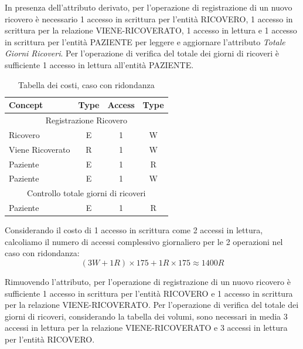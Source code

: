 \documentclass{article}
\begin{document}
In presenza dell'attributo derivato, per l'operazione di registrazione di un nuovo ricovero è necessario 1 accesso in scrittura per l'entità RICOVERO, 1 accesso in scrittura per la relazione VIENE-RICOVERATO, 1 accesso in lettura e 1 accesso in scrittura per l'entità PAZIENTE per leggere e aggiornare l'attributo \textit{Totale Giorni Ricoveri}.
Per l'operazione di verifica del totale dei giorni di ricoveri è sufficiente 1 accesso in lettura all'entità PAZIENTE.

\begin{table}[H]
	\centering
	\begin{tabular}{|l|c|c|c|}
		\hline
		\textbf{Concept} & \textbf{Type} & \textbf{Access} & \textbf{Type} \\ \hline
		\multicolumn{4}{|c|}{Registrazione Ricovero}                       \\ \hline
		Ricovero         & E             & 1               & W             \\ \hline
		Viene Ricoverato & R             & 1               & W             \\ \hline
		Paziente         & E             & 1               & R             \\ \hline
		Paziente         & E             & 1               & W             \\ \hline
		\multicolumn{4}{|c|}{Controllo totale giorni di ricoveri}          \\ \hline
		Paziente         & E             & 1               & R             \\ \hline
	\end{tabular}
	\caption{Tabella dei costi, caso con ridondanza}
	\label{tab:costi-attributo-ridondante}
\end{table}

Considerando il costo di 1 accesso in scrittura come 2 accessi in lettura, calcoliamo il numero di accessi complessivo giornaliero per le 2 operazioni nel caso con ridondanza:
\begin{equation}
	(3W + 1R) \times 175 + 1R \times 175 \approx 1400R
\end{equation}

Rimuovendo l'attributo, per l'operazione di registrazione di un nuovo ricovero è sufficiente 1 accesso in scrittura per l'entità RICOVERO e 1 accesso in scrittura per la relazione VIENE-RICOVERATO.
Per l'operazione di verifica del totale dei giorni di ricoveri, considerando la tabella dei volumi, sono necessari in media 3 accessi in lettura per la relazione VIENE-RICOVERATO e 3 accessi in lettura per l'entità RICOVERO.
\end{document}
